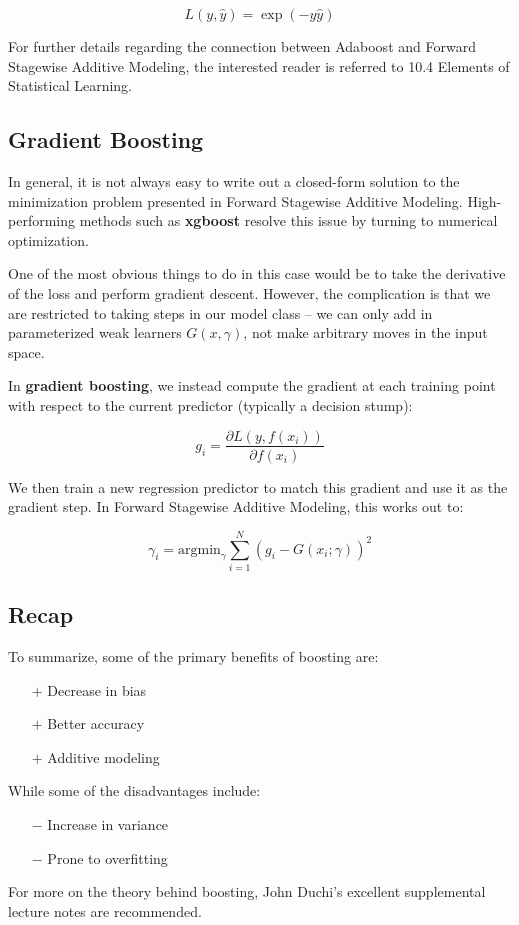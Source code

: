\documentclass{article}
\begin{document}
$$L(y,\hat{y}) = \exp(-y \hat{y})$$

For further details regarding the connection between Adaboost and Forward Stagewise Additive Modeling, the interested reader is referred to 10.4 Elements of Statistical Learning. 

\subsection{Gradient Boosting}

In general, it is not always easy to write out a closed-form solution to the minimization problem presented in Forward Stagewise Additive Modeling.  High-performing methods such as {\bf xgboost} resolve this issue by turning to numerical optimization.  

One of the most obvious things to do in this case would be to take the derivative of the loss and perform gradient descent.  However, the complication is that we are restricted to taking steps in our model class -- we can only add in parameterized weak learners $G(x, \gamma)$, not make arbitrary moves in the input space.

In {\bf gradient boosting}, we instead compute the gradient at each training point with respect to the current predictor (typically a decision stump):

$$g_i = \frac{\partial L(y, f(x_i))}{\partial f(x_i)}$$

We then train a new regression predictor to match this gradient and use it as the gradient step.  In Forward Stagewise Additive Modeling, this works out to:

$$\gamma_i = \text{argmin}_{\gamma} \sum_{i=1}^N(g_i - G(x_i; \gamma))^2$$

\subsection{Recap}

To summarize, some of the primary benefits of boosting are:

\begin{itemize}
	\item[$+$] Decrease in bias
	\item[$+$] Better accuracy
	\item[$+$] Additive modeling
\end{itemize}

While some of the disadvantages include:

\begin{itemize}
	\item[$-$] Increase in variance
	\item[$-$] Prone to overfitting
\end{itemize}

For more on the theory behind boosting, John Duchi's excellent supplemental lecture notes are recommended.
\end{document}
